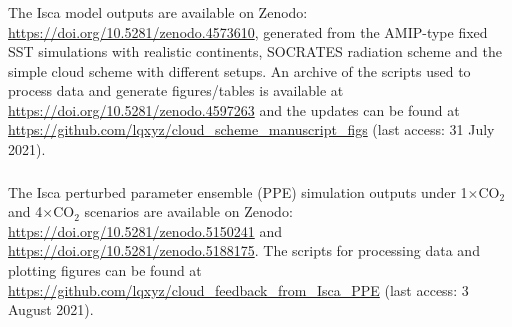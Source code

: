 \subsubsection{}

The Isca model outputs are available on Zenodo: \url{https://doi.org/10.5281/zenodo.4573610}, generated from the AMIP-type fixed SST simulations with realistic continents, SOCRATES radiation scheme and the simple cloud scheme with different setups. An archive of the scripts used to process data and generate figures/tables is available at \url{https://doi.org/10.5281/zenodo.4597263} and the updates can be found at \url{https://github.com/lqxyz/cloud_scheme_manuscript_figs} (last access: 31 July 2021).

\subsubsection{}

The Isca perturbed parameter ensemble (PPE) simulation outputs under 1$\times$CO$_2$ and 4$\times$CO$_2$ scenarios are available on Zenodo: \url{https://doi.org/10.5281/zenodo.5150241} and \url{https://doi.org/10.5281/zenodo.5188175}. The scripts for processing data and plotting figures can be found at \url{https://github.com/lqxyz/cloud_feedback_from_Isca_PPE} (last access: 3 August 2021).
